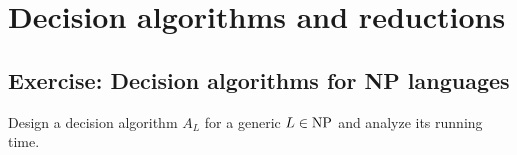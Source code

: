 \section{Decision algorithms and reductions}
\subsection{Exercise: Decision algorithms for NP languages}
Design a decision algorithm $A_L$ for a generic $L\in\mathrm{NP}$ and analyze its running time.

